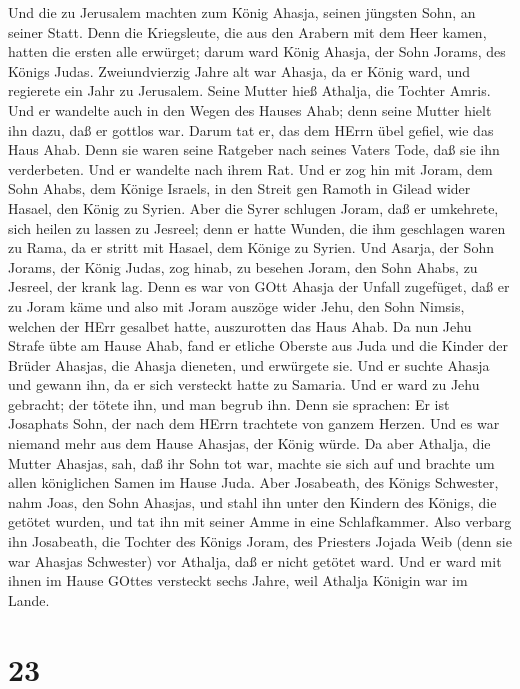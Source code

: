  Und die zu Jerusalem machten zum König Ahasja, seinen
jüngsten Sohn, an seiner Statt. Denn die Kriegsleute, die aus den
Arabern mit dem Heer kamen, hatten die ersten alle erwürget; darum ward
König Ahasja, der Sohn Jorams, des Königs Judas. 
Zweiundvierzig Jahre alt war Ahasja, da er König ward, und regierete ein
Jahr zu Jerusalem. Seine Mutter hieß Athalja, die Tochter Amris.
 Und er wandelte auch in den Wegen des Hauses Ahab; denn
seine Mutter hielt ihn dazu, daß er gottlos war.  Darum tat
er, das dem HErrn übel gefiel, wie das Haus Ahab. Denn sie waren seine
Ratgeber nach seines Vaters Tode, daß sie ihn verderbeten. 
Und er wandelte nach ihrem Rat. Und er zog hin mit Joram, dem Sohn
Ahabs, dem Könige Israels, in den Streit gen Ramoth in Gilead wider
Hasael, den König zu Syrien. Aber die Syrer schlugen Joram, 
daß er umkehrete, sich heilen zu lassen zu Jesreel; denn er hatte
Wunden, die ihm geschlagen waren zu Rama, da er stritt mit Hasael, dem
Könige zu Syrien. Und Asarja, der Sohn Jorams, der König Judas, zog
hinab, zu besehen Joram, den Sohn Ahabs, zu Jesreel, der krank lag.
 Denn es war von GOtt Ahasja der Unfall zugefüget, daß er zu
Joram käme und also mit Joram auszöge wider Jehu, den Sohn Nimsis,
welchen der HErr gesalbet hatte, auszurotten das Haus Ahab. 
Da nun Jehu Strafe übte am Hause Ahab, fand er etliche Oberste aus Juda
und die Kinder der Brüder Ahasjas, die Ahasja dieneten, und erwürgete
sie.  Und er suchte Ahasja und gewann ihn, da er sich
versteckt hatte zu Samaria. Und er ward zu Jehu gebracht; der tötete
ihn, und man begrub ihn. Denn sie sprachen: Er ist Josaphats Sohn, der
nach dem HErrn trachtete von ganzem Herzen. Und es war niemand mehr aus
dem Hause Ahasjas, der König würde.  Da aber Athalja, die
Mutter Ahasjas, sah, daß ihr Sohn tot war, machte sie sich auf und
brachte um allen königlichen Samen im Hause Juda.  Aber
Josabeath, des Königs Schwester, nahm Joas, den Sohn Ahasjas, und stahl
ihn unter den Kindern des Königs, die getötet wurden, und tat ihn mit
seiner Amme in eine Schlafkammer. Also verbarg ihn Josabeath, die
Tochter des Königs Joram, des Priesters Jojada Weib (denn sie war
Ahasjas Schwester) vor Athalja, daß er nicht getötet ward. 
Und er ward mit ihnen im Hause GOttes versteckt sechs Jahre, weil
Athalja Königin war im Lande.

\hypertarget{section-22}{%
\section{23}\label{section-22}}

